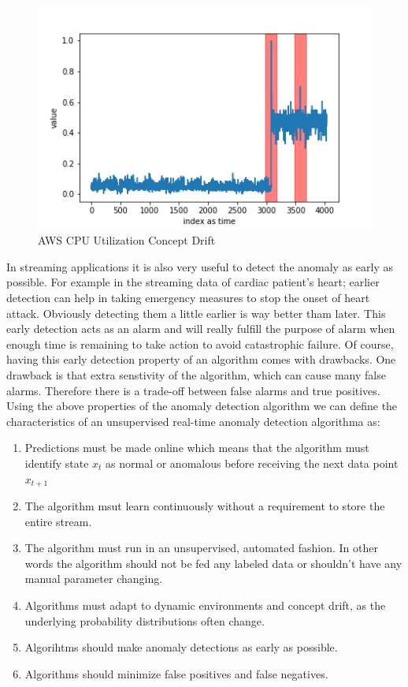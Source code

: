 \documentclass[12pt]{article}
\begin{document}
\begin{figure}[H]
\centering
        \includegraphics[width=\textwidth]{images/dataAnomalies/aws/rds_cpu_utilization_cc0c53.png}
    \caption{AWS CPU Utilization Concept Drift}
    \label{awsCpuUtilizationConceptDrift}
\end{figure}
In streaming applications it is also very useful to detect the anomaly as early as possible. For example in the streaming data of cardiac patient's heart; earlier detection can help in taking emergency measures to stop the onset of heart attack. Obviously detecting them a little earlier is way better tham later. This early detection acts as an alarm and will really fulfill the purpose of alarm when enough time is remaining to take action to avoid catastrophic failure. Of course, having this early detection property of an algorithm comes with drawbacks. One drawback is that extra senstivity of the algorithm, which can cause many false alarms. Therefore there is a trade-off between false alarms and  true positives. Using the above properties of the anomaly detection algorithm we can define the characteristics of an unsupervised real-time anomaly detection algorithma as:
\begin{enumerate}
\item Predictions must be made online which means that the algorithm must identify state $x_t$ as normal or anomalous before receiving the next data point $x_{t+1}$
\item The algorithm msut learn continuously without a requirement to store the entire stream. 
\item The algorithm must run in an unsupervised, automated fashion. In other words the algorithm should not be fed any labeled data or shouldn't have any manual parameter changing.
\item Algorithms must adapt to dynamic environments and concept drift, as the underlying probability distributions often change.
\item Algorihtms should make anomaly detections as early as possible.
\item Algorithms should minimize false positives and false negatives.
\end{enumerate}
\end{document}
